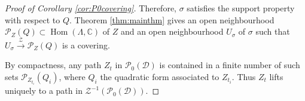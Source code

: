 \documentclass[leqno,11pt,twoside]{amsart}
\theoremstyle{definition}
\begin{document}
\begin{proof}[Proof of Corollary \ref{cor:P0covering}]
Therefore, $\sigma$ satisfies the support property with respect to $Q$. Theorem \ref{thm:mainthm} gives
an open neighbourhood ${\ensuremath{\mathcal P}}_Z(Q) \subset {\mathop{\mathrm{Hom}}\nolimits}(\Lambda, {\ensuremath{\mathbb{C}}})$ of $Z$ and an open neighbourhood $U_\sigma$ of $\sigma$ such that $U_\sigma \xrightarrow{\ensuremath{\mathcal Z}} {\ensuremath{\mathcal P}}_Z(Q)$ is a covering.

By compactness, any path $Z_t$ in ${\ensuremath{\mathcal P}}_0({\ensuremath{\mathcal D}})$ is contained in a finite number of such sets
${\ensuremath{\mathcal P}}_{Z_{t_i}}(Q_i)$, where $Q_i$ the quadratic form associated to $Z_{t_i}$.
Thus $Z_t$ lifts uniquely to a path in ${\ensuremath{\mathcal Z}}^{-1}({\ensuremath{\mathcal P}}_0({\ensuremath{\mathcal D}}))$.
\end{proof}

                      
     
\end{document}
